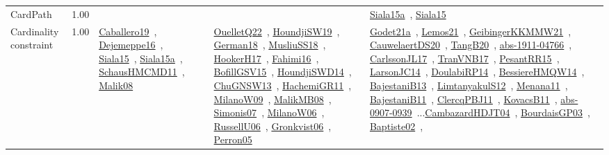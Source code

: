 {\begin{longtable}{p{3cm}r>{\raggedright\arraybackslash}p{6cm}>{\raggedright\arraybackslash}p{6cm}>{\raggedright\arraybackslash}p{8cm}}
\index{CardPath}\index{Constraints!CardPath}CardPath &  1.00 &  &  & \href{../works/Siala15a.pdf}{Siala15a}~\cite{Siala15a}, \href{../works/Siala15.pdf}{Siala15}~\cite{Siala15}\\
\index{Cardinality constraint}\index{Constraints!Cardinality constraint}Cardinality constraint &  1.00 & \href{../works/Caballero19.pdf}{Caballero19}~\cite{Caballero19}, \href{../works/Dejemeppe16.pdf}{Dejemeppe16}~\cite{Dejemeppe16}, \href{../works/Siala15.pdf}{Siala15}~\cite{Siala15}, \href{../works/Siala15a.pdf}{Siala15a}~\cite{Siala15a}, \href{../works/SchausHMCMD11.pdf}{SchausHMCMD11}~\cite{SchausHMCMD11}, \href{../works/Malik08.pdf}{Malik08}~\cite{Malik08} & \href{../works/OuelletQ22.pdf}{OuelletQ22}~\cite{OuelletQ22}, \href{../works/HoundjiSW19.pdf}{HoundjiSW19}~\cite{HoundjiSW19}, \href{../works/German18.pdf}{German18}~\cite{German18}, \href{../works/MusliuSS18.pdf}{MusliuSS18}~\cite{MusliuSS18}, \href{../works/HookerH17.pdf}{HookerH17}~\cite{HookerH17}, \href{../works/Fahimi16.pdf}{Fahimi16}~\cite{Fahimi16}, \href{../works/BofillGSV15.pdf}{BofillGSV15}~\cite{BofillGSV15}, \href{../works/HoundjiSWD14.pdf}{HoundjiSWD14}~\cite{HoundjiSWD14}, \href{../works/ChuGNSW13.pdf}{ChuGNSW13}~\cite{ChuGNSW13}, \href{../works/HachemiGR11.pdf}{HachemiGR11}~\cite{HachemiGR11}, \href{../works/MilanoW09.pdf}{MilanoW09}~\cite{MilanoW09}, \href{../works/MalikMB08.pdf}{MalikMB08}~\cite{MalikMB08}, \href{../works/Simonis07.pdf}{Simonis07}~\cite{Simonis07}, \href{../works/MilanoW06.pdf}{MilanoW06}~\cite{MilanoW06}, \href{../works/RussellU06.pdf}{RussellU06}~\cite{RussellU06}, \href{../works/Gronkvist06.pdf}{Gronkvist06}~\cite{Gronkvist06}, \href{../works/Perron05.pdf}{Perron05}~\cite{Perron05} & \href{../works/Godet21a.pdf}{Godet21a}~\cite{Godet21a}, \href{../works/Lemos21.pdf}{Lemos21}~\cite{Lemos21}, \href{../works/GeibingerKKMMW21.pdf}{GeibingerKKMMW21}~\cite{GeibingerKKMMW21}, \href{../works/CauwelaertDS20.pdf}{CauwelaertDS20}~\cite{CauwelaertDS20}, \href{../works/TangB20.pdf}{TangB20}~\cite{TangB20}, \href{../works/abs-1911-04766.pdf}{abs-1911-04766}~\cite{abs-1911-04766}, \href{../works/CarlssonJL17.pdf}{CarlssonJL17}~\cite{CarlssonJL17}, \href{../works/TranVNB17.pdf}{TranVNB17}~\cite{TranVNB17}, \href{../works/PesantRR15.pdf}{PesantRR15}~\cite{PesantRR15}, \href{../works/LarsonJC14.pdf}{LarsonJC14}~\cite{LarsonJC14}, \href{../works/DoulabiRP14.pdf}{DoulabiRP14}~\cite{DoulabiRP14}, \href{../works/BessiereHMQW14.pdf}{BessiereHMQW14}~\cite{BessiereHMQW14}, \href{../works/BajestaniB13.pdf}{BajestaniB13}~\cite{BajestaniB13}, \href{../works/LimtanyakulS12.pdf}{LimtanyakulS12}~\cite{LimtanyakulS12}, \href{../works/Menana11.pdf}{Menana11}~\cite{Menana11}, \href{../works/BajestaniB11.pdf}{BajestaniB11}~\cite{BajestaniB11}, \href{../works/ClercqPBJ11.pdf}{ClercqPBJ11}~\cite{ClercqPBJ11}, \href{../works/KovacsB11.pdf}{KovacsB11}~\cite{KovacsB11}, \href{../works/abs-0907-0939.pdf}{abs-0907-0939}~\cite{abs-0907-0939}...\href{../works/CambazardHDJT04.pdf}{CambazardHDJT04}~\cite{CambazardHDJT04}, \href{../works/BourdaisGP03.pdf}{BourdaisGP03}~\cite{BourdaisGP03}, \href{../works/Baptiste02.pdf}{Baptiste02}~\cite{Baptiste02}, 
\end{longtable}}

